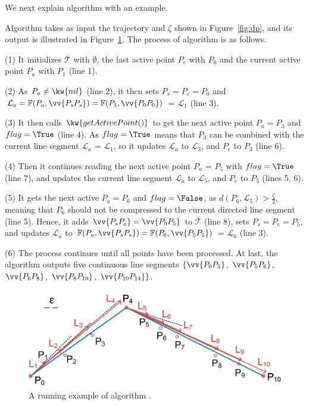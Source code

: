 {We next explain algorithm \operb with an example.

\begin{example}
\label{exam-alg-operb}
Algorithm  \operb takes as input the trajectory and $\zeta$ shown in Figure~\ref{fig:dp}, and its output is illustrated in Figure~\ref{exa-fig:operb}.
The process of algorithm  \operb is as follows.

\sstab(1) It initializes $\overline{\mathcal{T}}$  with $\emptyset$, the last active point $P_e$ with $P_0$ and the current active point $P_a$ with $P_1$ (line 1).

\sstab(2) As $P_a \ne \kw{nil}$ (line 2), it then sets $P_s = P_e = P_0$ and $\mathcal{L}_a = \mathbb{F}(P_a, \vv{P_sP_s}) =\mathbb{F}(P_1, \vv{P_0P_0})$ = $\mathcal{L}_1$ (line 3).

\sstab(3) It then calls $\kw{getActivePoint()}$ to get the next active point $P_a = P_3$ and $flag = \True$ (line 4). As $flag = \True$ means that $P_3$ can be combined with the current line segment $\mathcal{L}_a$ = $\mathcal{L}_1$, so it updates $\mathcal{L}_a$  to $\mathcal{L}_3$, and $P_e$ to $P_3$ (line 6).

\sstab(4) Then it continues reading the next active point $P_a$ = $P_5$ with $flag = \True$  (line 7), and updates the current line segment $\mathcal{L}_a$ to $\mathcal{L}_5$, and $P_e$  to $P_5$ (lines 5, 6).

\sstab(5) It gets the next active $P_a = P_6$ and $flag = \False$,  as $d(P_6, \mathcal{L}_5)>\frac{\zeta}{2}$, meaning that $P_6$ should not be compressed to the current directed line segment (line 5). Hence, it adds $\vv{P_sP_e} = \vv{P_0P_5}$ to $\overline{\mathcal{T}}$ (line 8), sets $P_s = P_e = P_5$, and updates $\mathcal{L}_a$ to $\mathbb{F}(P_a, \vv{P_sP_s}) =  \mathbb{F}(P_6, \vv{P_5P_5})$ = $\mathcal{L}_6$ (line 3).

\sstab(6) The process continues until all points have been processed. At last, the algorithm outputs five continuous line segments $\{\vv{P_0P_5}$, $\vv{P_5P_6}$, $\vv{P_6P_8}$, $\vv{P_8P_{10}}$, $\vv{P_{10}P_{14}}\}$.
\end{example}

\begin{figure}[tb!]
\centering
\includegraphics[scale = 0.64]{figures/Fig-oper.png}
\vspace{-2ex}
\caption{\small A running example of algorithm \operb.}\label{exa-fig:operb}
\vspace{-3ex}
\end{figure}

}
